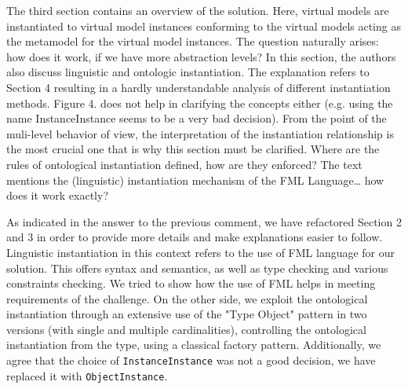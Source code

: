 \documentclass[10pt]{article}
\begin{document}
\begin{response}{The third section contains an overview of the solution. Here, virtual models are instantiated to virtual model instances conforming to the virtual models acting as the metamodel for the virtual model instances. The question naturally arises: how does it work, if we have more abstraction levels?  In this section, the authors also discuss linguistic and ontologic instantiation. The explanation refers to Section 4 resulting in a hardly understandable analysis of different instantiation methods. Figure 4. does not help in clarifying the concepts either (e.g. using the name InstanceInstance seems to be a very bad decision). From the point of the muli-level behavior of view, the interpretation of the instantiation relationship is the most crucial one that is why this section must be clarified. Where are the rules of ontological instantiation defined, how are they enforced? The text mentions the (linguistic) instantiation mechanism of the FML Language… how does it work exactly?}



As indicated in the answer to the previous comment, we have refactored Section 2 and 3 in order to provide more details and make explanations easier to follow. Linguistic instantiation in this context refers to the use of FML language for our solution. This offers syntax and semantics, as well as type checking and various constraints checking. We tried to show how the use of FML helps in meeting requirements of the challenge. On the other side, we exploit the ontological instantiation through an extensive use of the "Type Object" pattern in two versions (with single and multiple cardinalities), controlling the ontological instantiation from the type, using a classical factory pattern. Additionally, we agree that the choice of \texttt{InstanceInstance} was not a good decision, we have replaced it with \texttt{ObjectInstance}.%

\end{response}
\end{document}
